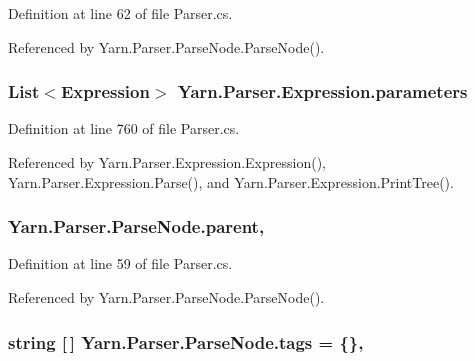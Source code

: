 Definition at line 62 of file Parser.\-cs.



Referenced by Yarn.\-Parser.\-Parse\-Node.\-Parse\-Node().

\hypertarget{a00104_a7b21380bead8ae08b2cfc6594edab32c}{
\subsubsection[{parameters}]{\setlength{\rightskip}{0pt plus 5cm}List$<${\bf Expression}$>$ Yarn.\-Parser.\-Expression.\-parameters\hspace{0.3cm}{\ttfamily [package]}}}\label{a00104_a7b21380bead8ae08b2cfc6594edab32c}


Definition at line 760 of file Parser.\-cs.



Referenced by Yarn.\-Parser.\-Expression.\-Expression(), Yarn.\-Parser.\-Expression.\-Parse(), and Yarn.\-Parser.\-Expression.\-Print\-Tree().

\hypertarget{a00148_af313a82103fcc2ff5a177dbb06b92f7b}{
\subsubsection[{parent}]{ Yarn.\-Parser.\-Parse\-Node.\-parent\hspace{0.3cm}{\ttfamily [package]}, {\ttfamily [inherited]}}}\label{a00148_af313a82103fcc2ff5a177dbb06b92f7b}


Definition at line 59 of file Parser.\-cs.



Referenced by Yarn.\-Parser.\-Parse\-Node.\-Parse\-Node().

\hypertarget{a00148_a58b3a15788fd2d4127d73619dc6d04ae}{
\subsubsection[{tags}]{\setlength{\rightskip}{0pt plus 5cm}string \mbox{[}$\,$\mbox{]} Yarn.\-Parser.\-Parse\-Node.\-tags = \{\}\hspace{0.3cm}{\ttfamily [package]}, {\ttfamily [inherited]}}}\label{a00148_a58b3a15788fd2d4127d73619dc6d04ae}


